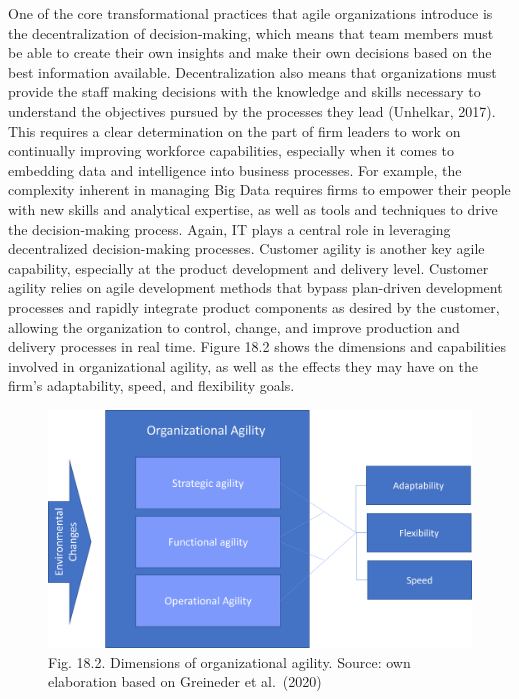 \documentclass[
  letterpaper,
  DIV=11,
  numbers=noendperiod]{scrreprt}
\begin{document}
One of the core transformational practices that agile organizations
introduce is the decentralization of decision-making, which means that
team members must be able to create their own insights and make their
own decisions based on the best information available. Decentralization
also means that organizations must provide the staff making decisions
with the knowledge and skills necessary to understand the objectives
pursued by the processes they lead (Unhelkar, 2017). This requires a
clear determination on the part of firm leaders to work on continually
improving workforce capabilities, especially when it comes to embedding
data and intelligence into business processes. For example, the
complexity inherent in managing Big Data requires firms to empower their
people with new skills and analytical expertise, as well as tools and
techniques to drive the decision-making process. Again, IT plays a
central role in leveraging decentralized decision-making processes.
Customer agility is another key agile capability, especially at the
product development and delivery level. Customer agility relies on agile
development methods that bypass plan-driven development processes and
rapidly integrate product components as desired by the customer,
allowing the organization to control, change, and improve production and
delivery processes in real time. Figure 18.2 shows the dimensions and
capabilities involved in organizational agility, as well as the effects
they may have on the firm's adaptability, speed, and flexibility goals.

\begin{figure}

{\centering \includegraphics[width=7.29167in,height=\textheight]{img/fig29.png}

}

\caption{Fig. 18.2. Dimensions of organizational agility. Source: own
elaboration based on Greineder et al.~(2020)}

\end{figure}
\end{document}
